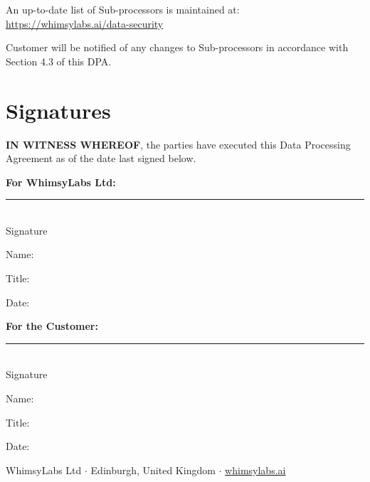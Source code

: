 \documentclass[11pt,a4paper]{article}
\begin{document}
\vspace{1cm}

An up-to-date list of Sub-processors is maintained at: \url{https://whimsylabs.ai/data-security}

\vspace{1cm}

Customer will be notified of any changes to Sub-processors in accordance with Section 4.3 of this DPA.

\newpage
\section*{Signatures}

\vspace{0.5cm}

\noindent\textbf{IN WITNESS WHEREOF}, the parties have executed this Data Processing Agreement as of the date last signed below.

\vspace{1.5cm}

\begin{minipage}[t]{0.45\textwidth}
\textbf{For WhimsyLabs Ltd:}

\vspace{2.5cm}

\noindent\rule{\textwidth}{0.4pt}\\
Signature

\vspace{0.3cm}

\noindent Name: \hrulefill

\vspace{0.3cm}

\noindent Title: \hrulefill

\vspace{0.3cm}

\noindent Date: \hrulefill
\end{minipage}
\hfill
\begin{minipage}[t]{0.45\textwidth}
\textbf{For the Customer:}

\vspace{2.5cm}

\noindent\rule{\textwidth}{0.4pt}\\
Signature

\vspace{0.3cm}

\noindent Name: \hrulefill

\vspace{0.3cm}

\noindent Title: \hrulefill

\vspace{0.3cm}

\noindent Date: \hrulefill
\end{minipage}

\vfill

\begin{center}
\small
WhimsyLabs Ltd $\cdot$ Edinburgh, United Kingdom $\cdot$ \href{https://whimsylabs.ai}{whimsylabs.ai}
\end{center}
\end{document}
